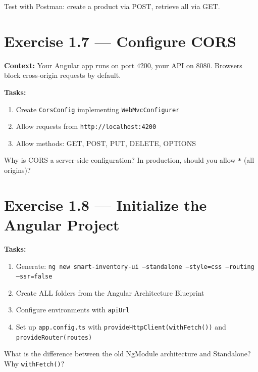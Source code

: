 \documentclass[12pt,a4paper]{report}
\begin{document}
\begin{checkpoint}
Test with Postman: create a product via POST, retrieve all via GET.
\end{checkpoint}

\section{Exercise 1.7 --- Configure CORS}

\textbf{Context:} Your Angular app runs on port 4200, your API on 8080. Browsers block cross-origin requests by default.

\textbf{Tasks:}
\begin{enumerate}
    \item Create \texttt{CorsConfig} implementing \texttt{WebMvcConfigurer}
    \item Allow requests from \texttt{http://localhost:4200}
    \item Allow methods: GET, POST, PUT, DELETE, OPTIONS
\end{enumerate}

\begin{thinkbox}
Why is CORS a server-side configuration? In production, should you allow \texttt{*} (all origins)?
\end{thinkbox}

\section{Exercise 1.8 --- Initialize the Angular Project}

\textbf{Tasks:}
\begin{enumerate}
    \item Generate: \texttt{ng new smart-inventory-ui --standalone --style=css --routing --ssr=false}
    \item Create ALL folders from the Angular Architecture Blueprint
    \item Configure environments with \texttt{apiUrl}
    \item Set up \texttt{app.config.ts} with \texttt{provideHttpClient(withFetch())} and \texttt{provideRouter(routes)}
\end{enumerate}

\begin{thinkbox}
What is the difference between the old NgModule architecture and Standalone? Why \texttt{withFetch()}?
\end{thinkbox}
\end{document}
